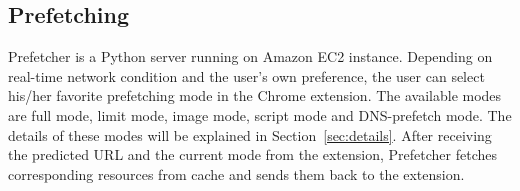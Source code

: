 \subsection{Prefetching}

Prefetcher is a Python server running on Amazon EC2 instance. Depending on real-time network condition and the user's own preference, the user can select his/her favorite prefetching mode in the Chrome extension. The available modes are full mode, limit mode, image mode, script mode and DNS-prefetch mode. The details of these modes will be explained in Section~\ref{sec:details}. After receiving the predicted URL and the current mode from the extension, Prefetcher fetches corresponding resources from cache and sends them back to the extension.

